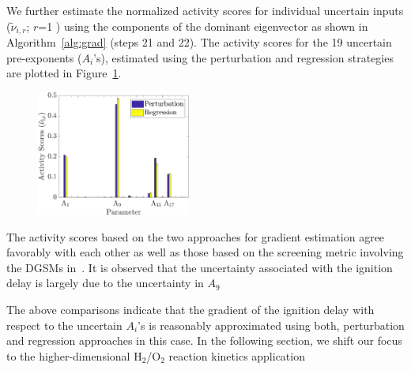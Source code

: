 We further estimate
the normalized activity scores for individual uncertain inputs ($\tilde{\nu}_{i,r}$; $r$=1 )
using the components of the dominant eigenvector as shown in Algorithm~\ref{alg:grad} (steps 21 and 22).
The activity scores for the 19 uncertain pre-exponents ($A_i$'s), estimated
using the perturbation and regression strategies are plotted in Figure~\ref{fig:comp_as}.  
%
\begin{figure}[htbp]
 \begin{center}
  \includegraphics[width=0.45\textwidth]{./Figures/comp_as19D}
\caption{}
\label{fig:comp_as}
\end{center}
\end{figure}
%
The activity scores based on the two approaches for gradient estimation agree favorably 
with each other as well as those
based on the screening metric involving the DGSMs in~\cite{Vohra:2018}. It is observed that the uncertainty
associated with the ignition delay is largely due to the uncertainty in $A_9$ 

The above comparisons indicate that the gradient of the ignition delay with respect to the
uncertain $A_i$'s is reasonably approximated using both, perturbation  and regression 
approaches in this case. 
In the following section, we shift our focus to 
the higher-dimensional H$_2$/O$_2$ reaction kinetics application 
